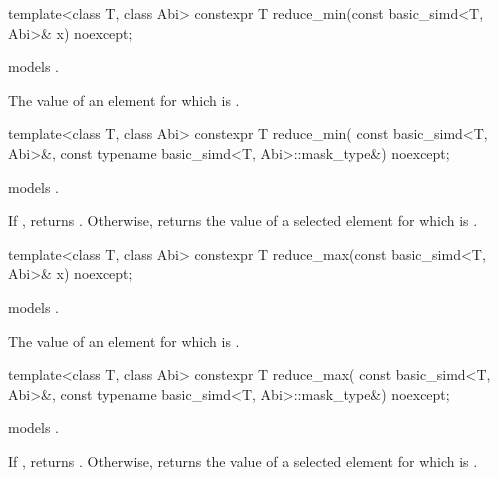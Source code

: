 \begin{itemdecl}
template<class T, class Abi> constexpr T reduce_min(const basic_simd<T, Abi>& x) noexcept;
\end{itemdecl}

\begin{itemdescr}
  \pnum\constraints
   models .

  \pnum\returns
  The value of an element  for which  is  \foralli.
\end{itemdescr}

\begin{itemdecl}
template<class T, class Abi>
  constexpr T reduce_min(
    const basic_simd<T, Abi>&, const typename basic_simd<T, Abi>::mask_type&) noexcept;
\end{itemdecl}

\begin{itemdescr}
  \pnum\constraints
   models .

  \pnum\returns
  If , returns .
  Otherwise, returns the value of a selected element  for which  is  \forallmaskedi.
\end{itemdescr}

\begin{itemdecl}
template<class T, class Abi> constexpr T reduce_max(const basic_simd<T, Abi>& x) noexcept;
\end{itemdecl}

\begin{itemdescr}
  \pnum\constraints
   models .

  \pnum\returns
  The value of an element  for which  is  \foralli.
\end{itemdescr}

\begin{itemdecl}
template<class T, class Abi>
  constexpr T reduce_max(
    const basic_simd<T, Abi>&, const typename basic_simd<T, Abi>::mask_type&) noexcept;
\end{itemdecl}

\begin{itemdescr}
  \pnum\constraints
   models .

  \pnum\returns
  If , returns .
  Otherwise, returns the value of a selected element  for which  is  \forallmaskedi.
\end{itemdescr}

